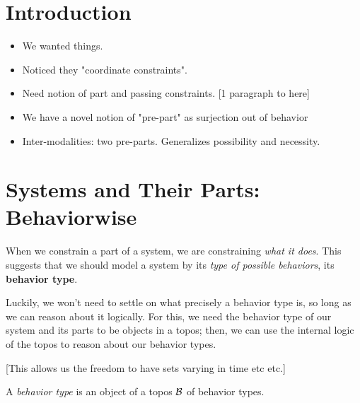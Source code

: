 
\section{Introduction}

\begin{itemize}
    \item We wanted things.
    \item Noticed they "coordinate constraints".
    \item Need notion of part and passing constraints. [1 paragraph to here]
    \item We have a novel notion of "pre-part" as surjection out of behavior
    \item Inter-modalities: two pre-parts. Generalizes possibility and necessity.
\end{itemize}

\section{Systems and Their Parts: Behaviorwise}

When we constrain a part of a system, we are constraining \emph{what it does}. This suggests that we should model a system by its \emph{type of possible behaviors}, its \textbf{behavior type}.

Luckily, we won't need to settle on what precisely a behavior type is, so long as we can reason about it logically. For this, we need the behavior type of our system and its parts to be objects in a topos; then, we can use the internal logic of the topos to reason about our behavior types.

[This allows us the freedom to have sets varying in time etc etc.]

\begin{defn}
A \emph{behavior type} is an object of a topos $\operatorname{\mathcal{B}}$ of behavior types.
\end{defn}

